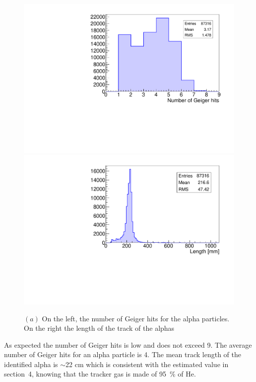 \documentclass[main.tex]{subfiles}
\begin{document}
\begin{figure}[h!]
\begin{center}
\includegraphics[scale=0.33]{pictures/Chap5/source_selection_surface_gghits_alpha.pdf}
\includegraphics[scale=0.33]{pictures/Chap5/source_selection_surface_length_alpha.pdf}


\caption{$(a)$ On the left, the number of Geiger hits for the alpha particles. On the right the length of the track of the alphas}
\label{alphaLengthSSS}
\end{center}
\end{figure}


\noindent As expected the number of Geiger hits is low and does not exceed 9. The average number of Geiger hits for an alpha particle is 4. The mean track length of the identified alpha is $\sim$22 cm which is consistent with the estimated value in section~4, knowing that the tracker gas is made of 95~\% of He.  
\end{document}
